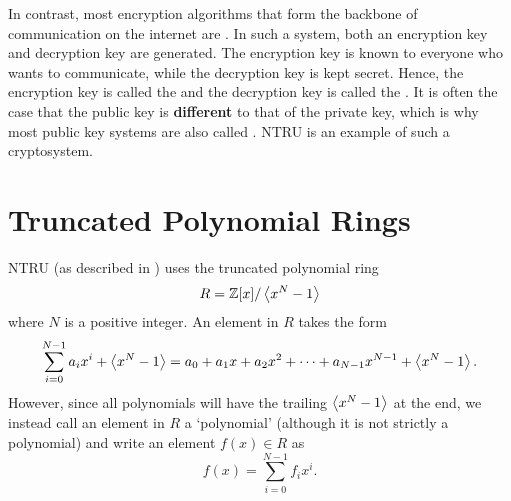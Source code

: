In contrast, most encryption algorithms that form the backbone of communication on the internet are . In such a system, both an encryption key and decryption key are generated. The encryption key is known to everyone who wants to communicate, while the decryption key is kept secret. Hence, the encryption key is called the  and the decryption key is called the . It is often the case that the public key is \textbf{different} to that of the private key, which is why most public key systems are also called . NTRU is an example of such a cryptosystem.

\section{Truncated Polynomial Rings}
NTRU (as described in \cite[\S 1.1]{hoffstein_pipher_silverman_1998}) uses the truncated polynomial ring
\[
    R = \mathbb{Z}[x] / \left\langle x^N - 1\right\rangle
\]
where $N$ is a positive integer. An element in $R$ takes the form
\[
    \sum_{i=0}^{N-1}a_ix^i + \left\langle x^N - 1\right\rangle = a_0 + a_1x + a_2x^2 + \cdots + a_{N-1}x^{N-1} + \left\langle x^N - 1\right\rangle.
\]
However, since all polynomials will have the trailing $\left\langle x^N - 1\right\rangle$ at the end, we instead call an element in $R$ a `polynomial' (although it is not strictly a polynomial) and write an element $f(x) \in R$ as
\[
    f(x) = \sum_{i=0}^{N-1}f_ix^i.
\]

